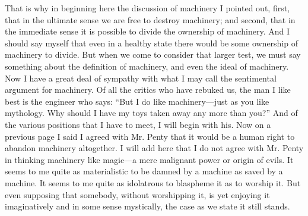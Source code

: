 \documentclass{book}
\begin{document}
That is why in beginning here the discussion of machinery I pointed out, first, that in the ultimate sense we are free to destroy machinery; and second, that in the immediate sense it is possible to divide the ownership of machinery. And I should say myself that even in a healthy state there would be some ownership of machinery to divide. But when we come to consider that larger test, we must say something about the definition of machinery, and even the ideal of machinery. Now I have a great deal of sympathy with what I may call the sentimental argument for machinery. Of all the critics who have rebuked us, the man I like best is the engineer who says: “But I do like machinery—just as you like mythology. Why should I have my toys taken away any more than you?” And of the various positions that I have to meet, I will begin with his. Now on a previous page I said I agreed with Mr. Penty that it would be a human right to abandon machinery altogether. I will add here that I do not agree with Mr. Penty in thinking machinery like magic—a mere malignant power or origin of evils. It seems to me quite as materialistic to be damned by a machine as saved by a machine. It seems to me quite as idolatrous to blaspheme it as to worship it. But even supposing that somebody, without worshipping it, is yet enjoying it imaginatively and in some sense mystically, the case as we state it still stands.
\end{document}
